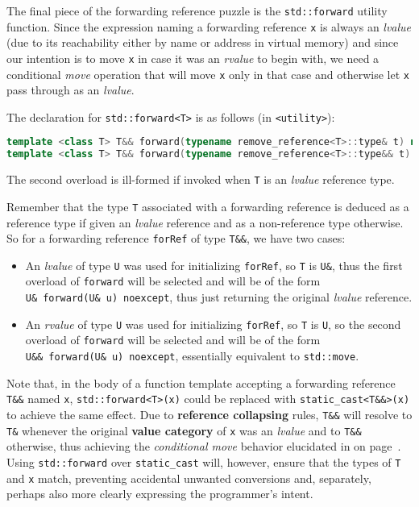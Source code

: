 The final piece of the forwarding reference puzzle is the
\texttt{std::forward} utility function. Since the expression naming a
forwarding reference \texttt{x} is always an \emph{lvalue} (due to its
reachability either by name or address in virtual memory) and since our
intention is to move \texttt{x} in case it was an \emph{rvalue} to begin
with, we need a conditional \emph{move} operation that will move
\texttt{x} only in that case and otherwise let \texttt{x} pass through as
an \emph{lvalue}.

The declaration for \texttt{std::forward<T>} is as follows (in
\texttt{<utility>}):

\begin{lstlisting}[language=C++]
template <class T> T&& forward(typename remove_reference<T>::type& t) noexcept;
template <class T> T&& forward(typename remove_reference<T>::type&& t) noexcept;
\end{lstlisting}
    
\noindent The second overload is ill-formed if invoked when \texttt{T} is an
\emph{lvalue} reference type.

Remember that the type \texttt{T} associated with a forwarding reference
is deduced as a reference type if given an \emph{lvalue} reference and
as a non-reference type otherwise. So for a forwarding reference
\texttt{forRef} of type \texttt{T\&\&}, we have two cases:
\begin{itemize}
\item{An \emph{lvalue} of type \texttt{U} was used for initializing \texttt{forRef}, so \texttt{T} is \texttt{U\&}, thus the first overload of \texttt{forward} will be selected and will be of the form \texttt{U\&}~\texttt{forward(U\&}~\texttt{u)}~\texttt{noexcept}, thus just returning the original \emph{lvalue} reference.}
\item{An \emph{rvalue} of type \texttt{U} was used for initializing \texttt{forRef}, so \texttt{T} is \texttt{U}, so the second overload of \texttt{forward} will be selected and will be of the form \texttt{U\&\&}~\texttt{forward(U\&}~\texttt{u)}~\texttt{noexcept}, essentially equivalent to \texttt{std::move}.}
\end{itemize}
Note that, in the body of a function template accepting a forwarding
reference \texttt{T\&\&} named \texttt{x}, \texttt{std::forward<T>(x)}
could be replaced with \texttt{static\_cast<T\&\&>(x)} to achieve the
same effect. Due to \textbf{reference collapsing} rules, \texttt{T\&\&}
will resolve to \texttt{T\&} whenever the original \textbf{value
category} of \texttt{x} was an \emph{lvalue} and to \texttt{T\&\&}
otherwise, thus achieving the \emph{conditional move} behavior
elucidated in \textit{} on page~\pageref{description-forwardingref}. Using \texttt{std::forward} over \texttt{static\_cast}
will, however, ensure that the types of \texttt{T} and \texttt{x} match,
preventing accidental unwanted conversions and, separately, perhaps also
more clearly expressing the programmer's intent.

